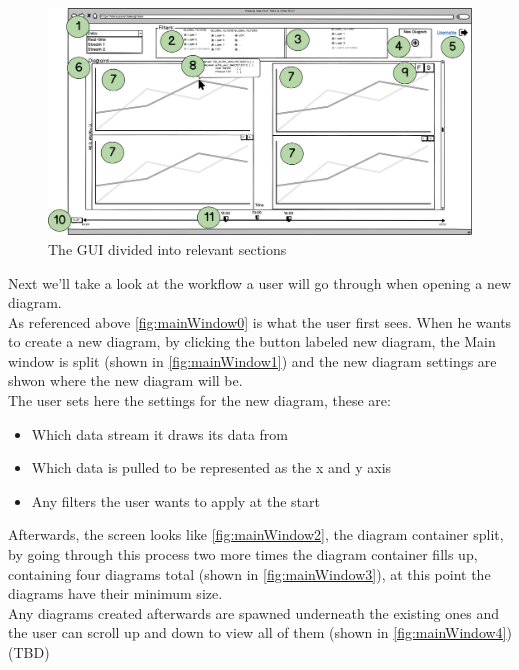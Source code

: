 \documentclass[twoside, english, draft]{Pflichtenheft}
\begin{document}
\vfill

\begin{figure}[ht]
\centering
\includegraphics[width=\textwidth]{Images/07MW.png}
	\caption{The GUI divided into relevant sections}
	\label{fig:mainWindow5}
\end{figure}

\vfill
\clearpage

Next we'll take a look at the workflow a user will go through when opening a new diagram.
\\
As referenced above \autoref{fig:mainWindow0} is what the user first sees. When he wants to create a new diagram, by clicking the button labeled new diagram, the Main window is split (shown in \autoref{fig:mainWindow1}) and the new diagram settings are shwon where the new diagram will be.
\\
The user sets here the settings for the new diagram, these are: 
\\
\begin{itemize}
\item{Which data stream it draws its data from}
\item{Which data is pulled to be represented as the x and y axis}
\item{Any filters the user wants to apply at the start}
\end{itemize}

Afterwards, the screen looks like \autoref{fig:mainWindow2}, the \gls{diagram container} split, by going through this process two more times the diagram container fills up, containing four diagrams total (shown in \autoref{fig:mainWindow3}), at this point the diagrams have their minimum size.
\\
Any diagrams created afterwards are spawned underneath the existing ones and the user can scroll up and down to view all of them (shown in \autoref{fig:mainWindow4}) (TBD)
\end{document}
